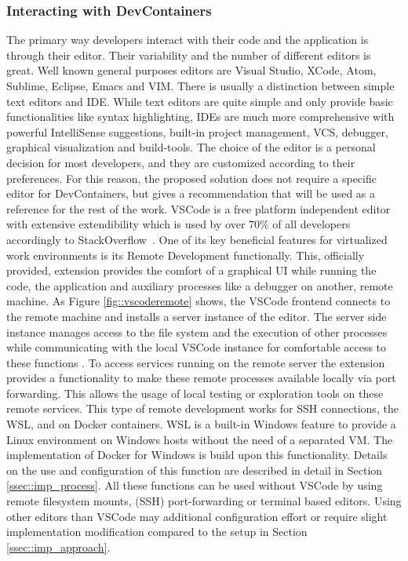 \documentclass[12pt, a4paper]{article}
\begin{document}
        \subsubsection{Interacting with DevContainers}
        The primary way developers interact with their code and the application is through their editor. Their variability and the number of different editors is great. Well known general purposes editors are Visual Studio, XCode, Atom, Sublime, Eclipse, Emacs and VIM. There is usually a distinction between simple text editors and \acl{IDE}. While text editors are quite simple and only provide basic functionalities like syntax highlighting, \ac{IDE}s are much more comprehensive with powerful IntelliSense suggestions, built-in project management, \ac{VCS}, debugger, graphical visualization and build-tools. The choice of the editor is a personal decision for most developers, and they are customized according to their preferences. For this reason, the proposed solution does not require a specific editor for DevContainers, but gives a recommendation that will be used as a reference for the rest of the work.\newline
        \ac{VSCode} is a free platform independent editor with extensive extendibility which is used by over 70\% of all developers accordingly to StackOverflow~\cite{stackoverflow2021}. One of its key beneficial features for virtualized work environments is its Remote Development functionally. This, officially provided, extension provides the comfort of a graphical \ac{UI} while running the code, the application and auxiliary processes like a debugger on another, remote machine. As Figure \ref{fig::vscoderemote} shows, the \ac{VSCode} frontend connects to the remote machine and installs a server instance of the editor. The server side instance manages access to the file system and the execution of other processes while communicating with the local \ac{VSCode} instance for comfortable access to these functions \cite{vscodedevcontainer}. To access services running on the remote server the extension provides a functionality to make these remote processes available locally via port forwarding. This allows the usage of local testing or exploration tools on these remote services. This type of remote development works for \ac{SSH} connections, the \ac{WSL}, and on Docker containers. \ac{WSL} is a built-in Windows feature to provide a Linux environment on Windows hosts without the need of a separated \ac{VM}. The implementation of Docker for Windows is build upon this functionality. Details on the use and configuration of this function are described in detail in Section \ref{ssec::imp_process}. All these functions can be used without \ac{VSCode} by using remote filesystem mounts, (\ac{SSH}) port-forwarding or terminal based editors. Using other editors than \ac{VSCode} may additional configuration effort or require slight implementation modification compared to the setup in Section \ref{ssec::imp_approach}.
\end{document}
